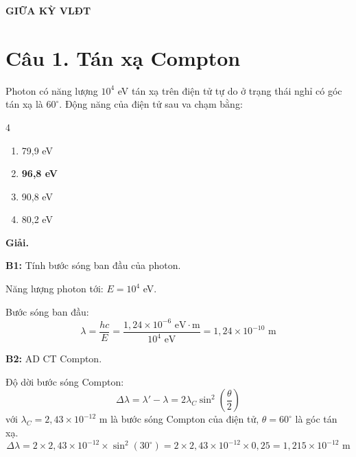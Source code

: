 \documentclass[11pt,a4paper]{article}
\begin{document}
\begin{center}
    {\Large\bfseries GIỮA KỲ VLĐT}
\end{center}
\vspace{0.2cm}

\section*{Câu 1. Tán xạ Compton}

Photon có năng lượng $10^4$ eV tán xạ trên điện tử tự do ở trạng thái nghỉ có góc tán xạ là $60^\circ$. Động năng của điện tử sau va chạm bằng:

\begin{multicols}{4}
\begin{enumerate}[label=\Alph*., itemsep=1pt, topsep=1pt, parsep=0pt, leftmargin=1.8em]
    \item 79,9 eV
    \item \textbf{96,8 eV}
    \item 90,8 eV
    \item 80,2 eV
\end{enumerate}
\end{multicols}

\textbf{Giải.}

\textbf{B1:} Tính bước sóng ban đầu của photon.

Năng lượng photon tới: $E = 10^4$ eV.

Bước sóng ban đầu:
\begin{equation*}
    \lambda = \frac{hc}{E} = \frac{1{,}24 \times 10^{-6} \text{ eV}\cdot\text{m}}{10^4 \text{ eV}} = 1{,}24 \times 10^{-10} \text{ m}
\end{equation*}

\textbf{B2:} AD CT Compton.

Độ dời bước sóng Compton:
\begin{equation*}
    \Delta\lambda = \lambda' - \lambda = 2\lambda_C \sin^2\!\left(\frac{\theta}{2}\right)
\end{equation*}
với $\lambda_C = 2{,}43 \times 10^{-12}$ m là bước sóng Compton của điện tử, $\theta = 60^\circ$ là góc tán xạ.
\begin{equation*}
    \Delta\lambda = 2 \times 2{,}43 \times 10^{-12} \times \sin^2(30^\circ) = 2 \times 2{,}43 \times 10^{-12} \times 0{,}25 = 1{,}215 \times 10^{-12} \text{ m}
\end{equation*}
\end{document}
